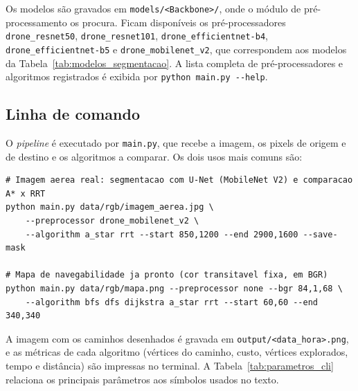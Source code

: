\documentclass[
    12pt,
    openright,
    oneside,
    a4paper,
    english,
    brazil
]{abntex2}
\begin{document}
\begin{apendicesenv}
Os modelos são gravados em \texttt{models/<Backbone>/}, onde o módulo de pré-processamento os procura. Ficam disponíveis os pré-processadores \texttt{drone\_resnet50}, \texttt{drone\_resnet101}, \texttt{drone\_efficientnet-b4}, \texttt{drone\_efficientnet-b5} e \texttt{drone\_mobilenet\_v2}, que correspondem aos modelos da Tabela~\ref{tab:modelos_segmentacao}. A lista completa de pré-processadores e algoritmos registrados é exibida por \texttt{python main.py -{}-help}.

\subsection{Linha de comando}

O \textit{pipeline} é executado por \texttt{main.py}, que recebe a imagem, os pixels de origem e de destino e os algoritmos a comparar. Os dois usos mais comuns são:

\begin{lstlisting}[style=comandos]
# Imagem aerea real: segmentacao com U-Net (MobileNet V2) e comparacao A* x RRT
python main.py data/rgb/imagem_aerea.jpg \
    --preprocessor drone_mobilenet_v2 \
    --algorithm a_star rrt --start 850,1200 --end 2900,1600 --save-mask

# Mapa de navegabilidade ja pronto (cor transitavel fixa, em BGR)
python main.py data/rgb/mapa.png --preprocessor none --bgr 84,1,68 \
    --algorithm bfs dfs dijkstra a_star rrt --start 60,60 --end 340,340
\end{lstlisting}

A imagem com os caminhos desenhados é gravada em \texttt{output/<data\_hora>.png}, e as métricas de cada algoritmo (vértices do caminho, custo, vértices explorados, tempo e distância) são impressas no terminal. A Tabela~\ref{tab:parametros_cli} relaciona os principais parâmetros aos símbolos usados no texto.


\end{apendicesenv}
\end{document}
